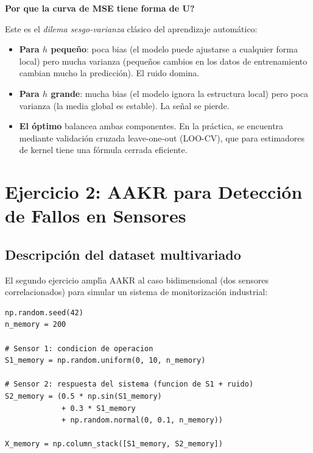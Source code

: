 \documentclass[12pt,a4paper]{article}
\newcommand{\porque}[2]{%
  \vspace{8pt}%
  \begin{mdframed}[backgroundcolor=porqueFondo,
                   linecolor=porqueBorde,
                   linewidth=1.5pt,
                   leftmargin=0pt,
                   rightmargin=0pt,
                   innerleftmargin=10pt,
                   innerrightmargin=10pt,
                   innertopmargin=6pt,
                   innerbottommargin=6pt]
    {\color{porqueBorde}\bfseries\small Por que #1}\\[3pt]
    {\small #2}
  \end{mdframed}%
  \vspace{8pt}%
}
\begin{document}
\porque{la curva de MSE tiene forma de U?}{%
Este es el \emph{dilema sesgo-varianza} cl\'asico del aprendizaje autom\'atico:
\begin{itemize}[leftmargin=1.5em,noitemsep]
  \item \textbf{Para $h$ peque\~no}: poca bias (el modelo puede ajustarse a
        cualquier forma local) pero mucha varianza (peque\~nos cambios en los datos
        de entrenamiento cambian mucho la predicci\'on). El ruido domina.
  \item \textbf{Para $h$ grande}: mucha bias (el modelo ignora la estructura
        local) pero poca varianza (la media global es estable). La se\~nal se pierde.
  \item \textbf{El \'optimo} balancea ambas componentes. En la pr\'actica, se
        encuentra mediante validaci\'on cruzada leave-one-out (LOO-CV), que para
        estimadores de kernel tiene una f\'ormula cerrada eficiente.
\end{itemize}}

\section{Ejercicio 2: AAKR para Detecci\'on de Fallos en Sensores}

\subsection{Descripci\'on del dataset multivariado}

El segundo ejercicio ampl\'{\i}a AAKR al caso bidimensional (dos sensores
correlacionados) para simular un sistema de monitorizaci\'on industrial:

\begin{lstlisting}[caption={Generaci\'on del dataset de 2 sensores correlacionados},
                   label={lst:dataset2d}]
np.random.seed(42)
n_memory = 200

# Sensor 1: condicion de operacion
S1_memory = np.random.uniform(0, 10, n_memory)

# Sensor 2: respuesta del sistema (funcion de S1 + ruido)
S2_memory = (0.5 * np.sin(S1_memory)
             + 0.3 * S1_memory
             + np.random.normal(0, 0.1, n_memory))

X_memory = np.column_stack([S1_memory, S2_memory])
\end{lstlisting}
\end{document}
